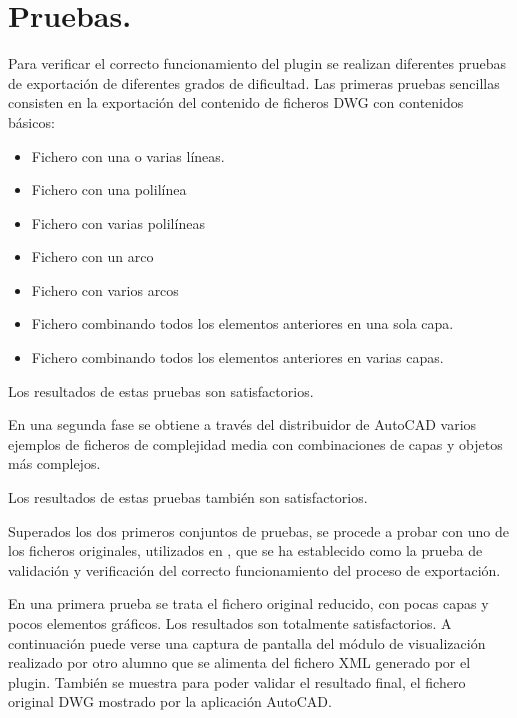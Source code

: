 \section{Pruebas.}

Para verificar el correcto funcionamiento del plugin se realizan diferentes pruebas de exportación de diferentes grados de dificultad. Las primeras pruebas sencillas consisten en la exportación del contenido de ficheros DWG con contenidos básicos:

\begin{itemize}

\item{Fichero con una o varias líneas.}
\item{Fichero con una polilínea}
\item{Fichero con varias polilíneas}
\item{Fichero con un arco}
\item{Fichero con varios arcos}
\item{Fichero combinando todos los elementos anteriores en una sola capa.}
\item{Fichero combinando todos los elementos anteriores en varias capas.}

\end{itemize}

Los resultados de estas pruebas son satisfactorios.

En una segunda fase se obtiene a través del distribuidor de AutoCAD varios ejemplos de ficheros de complejidad media con combinaciones de capas y objetos más complejos.

Los resultados de estas pruebas también son satisfactorios. 

Superados los dos primeros conjuntos de pruebas, se procede a probar con uno de los ficheros originales, utilizados en \cite{Miguel-Munoz}, que se ha establecido como la prueba de validación y verificación del correcto funcionamiento del proceso de exportación. 

En una primera prueba se trata el fichero original reducido, con pocas capas y pocos elementos gráficos. Los resultados son totalmente satisfactorios. A continuación puede verse una captura de pantalla del módulo de visualización \cite{Luis-Fernandez-SSII} realizado por otro alumno que se alimenta del fichero XML generado por el plugin. También se muestra para poder validar el resultado final, el fichero original DWG mostrado por la aplicación AutoCAD.

